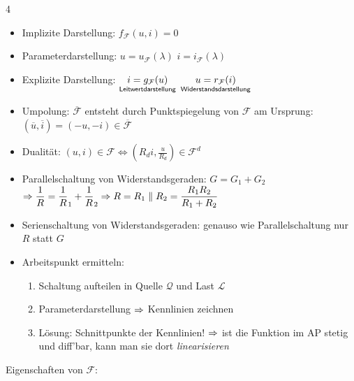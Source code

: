 \documentclass[fs, footer]{latex4ei}
\begin{document}
\begin{multicols*}{4}
{        \begin{itemize}
            \item Implizite Darstellung: $f_{\mathcal F} (u,i) = 0$
            \item Parameterdarstellung: $u = u_{\mathcal F} ( \lambda )$ \quad $ i = i_{\mathcal F} (\lambda )$
            \item Explizite Darstellung: $\underset{\sf Leitwertdarstellung}{i = g_{\mathcal F} (u)}$ \quad $\underset{\sf Widerstandsdarstellung}{u = r_{\mathcal F} (i)}$
            \item Umpolung: $\overline {\mathcal F}$ entsteht durch Punktspiegelung von $\mathcal F$ am Ursprung: $(\overline u, \overline i) = (- u, - i) \in \overline {\mathcal F}$
            \item Dualität: $(u,i) \in \mathcal F \Leftrightarrow ( R_d i, \frac{ u}{ R_d}) \in {\mathcal F}^d$
            \item Parallelschaltung von Widerstandsgeraden: $G = G_1 + G_2$ \\
                  $\Rightarrow \dfrac 1 R = \dfrac 1 R_1 + \dfrac 1 R_2 \Rightarrow R = R_1 \parallel R_2 = \dfrac{R_1 R_2}{R_1 + R_2}$
            \item Serienschaltung von Widerstandsgeraden: genauso wie Parallelschaltung nur $R$ statt $G$
            \item Arbeitspunkt ermitteln:
                  \begin{enumerate}
                      \item Schaltung aufteilen in Quelle $\mathcal Q$ und Last $\mathcal L$
                      \item Parameterdarstellung $\Rightarrow$ Kennlinien zeichnen
                      \item Lösung: Schnittpunkte der Kennlinien! $\Rightarrow$ ist die Funktion im AP stetig und diff'bar, kann man sie dort \emph{linearisieren}
                  \end{enumerate}
        \end{itemize}

        Eigenschaften von $\mathcal F$:

}
\end{multicols*}
\end{document}

